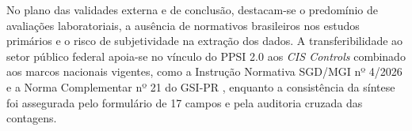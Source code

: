 No plano das validades externa e de conclusão, destacam-se o predomínio de avaliações laboratoriais, a ausência de normativos brasileiros nos estudos primários e o risco de subjetividade na extração dos dados. A transferibilidade ao setor público federal apoia-se no vínculo do PPSI 2.0 aos \textit{CIS Controls} combinado aos marcos nacionais vigentes, como a Instrução Normativa SGD/MGI nº 4/2026 e a Norma Complementar nº 21 do GSI-PR \cite{ppsi2026,in4_2026,nc21_2014}, enquanto a consistência da síntese foi assegurada pelo formulário de 17 campos e pela auditoria cruzada das contagens.
\FloatBarrier
